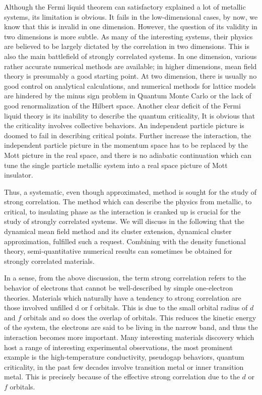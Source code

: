 Although the Fermi liquid theorem can satisfactory explained a lot of metallic
systems, its limitation is obvious. It fails in the low-dimensional
cases, by now, we know that this is invalid in one dimension. \cite{Luttinger-1963,Tomonaga-1950} 
However, the question of its validity in two dimensions is more subtle. As many of the interesting systems, their
physics are believed to be largely dictated by the correlation in two dimensions.
This is also the main battlefield of strongly correlated systems. In one dimension, 
various rather accurate numerical methods are available; in higher dimensions, 
mean field theory is presumably a good starting point. At two dimension, there is 
usually no good control on analytical calculations, and numerical methods for lattice
models are hindered by the minus sign problem in Quantum Monte Carlo or the lack
of good renormalization of the Hilbert space. Another clear deficit of the Fermi liquid 
theory is its inability to describe the quantum criticality, It is obvious that the 
criticality involves collective behaviors. \cite{Hertz-1976} An independent particle picture is 
doomed to fail in describing critical points. Further increase the interaction, 
the independent particle picture in the momentum space has to be replaced by the Mott 
picture in the real space, and there is no adiabatic continuation which can tune
the single particle metallic system into a real space picture of Mott insulator. \cite{Mott-Peierls-1937}

Thus, a systematic, even though approximated, method is sought for the study of strong correlation. 
The method which can describe the physics from metallic, to critical, to insulating phase as 
the interaction is cranked up is crucial for the study of strongly correlated systems. 
We will discuss in the following that the dynamical mean field method and its cluster extension, 
dynamical cluster approximation, fulfilled such a request. \cite{RevModPhys.68.13,DCA-2005} Combining with the density functional theory,
semi-quantitative numerical results can sometimes be obtained for strongly correlated materials. 


In a sense, from the above discussion, the term strong correlation refers to the behavior of electrons
that cannot be well-described by simple one-electron theories. Materials
which naturally have a tendency to strong correlation are those involved
unfilled d or f orbitals. This is due to the small orbital radius of
$d$ and $f$ orbitals and so does the overlap of orbitals.
This reduces the kinetic energy of the system, the electrons are said to be living 
in the narrow band, and thus the interaction becomes more important. Many interesting materials discovery which host
a range of interesting experimental observations, the most prominent example is the
high-temperature conductivity, pseudogap behaviors, quantum
criticality, in the past few decades involve transition
metal or inner transition metal. This is precisely because of the effective
strong correlation due to the $d$ or $f$ orbitals.

